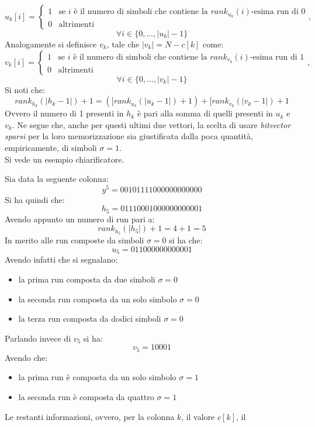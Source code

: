 \[u_k[i]=
  \begin{cases}
    1&\mbox{se }i \mbox{ è il numero di simboli che contiene la
    }rank_{u_k}(i)\mbox{-esima run di 0}\\
    0&\mbox{altrimenti}
  \end{cases},
\]
\vspace{-5mm}
\[\forall i\in\{0,\ldots,|u_k|-1\}\]
Analogamente si definisce $v_k$, tale che $|v_k|=N-c[k]$ come:
\[v_k[i]=
  \begin{cases}
    1&\mbox{se }i \mbox{ è il numero di simboli che contiene la
    }rank_{v_k}(i)\mbox{-esima run di 1}\\
    0&\mbox{altrimenti}
  \end{cases},
\]
\vspace{-5mm}
\[\forall i\in\{0,\ldots,|v_k|-1\}\]
Si noti che:
\[rank_{h_k}(|h_k-1|)+1=([rank_{u_k}(|u_k-1|)+1)+[rank_{v_k}(|v_k-1|)+1\]
Ovvero il numero di 1 presenti in $h_k$ è pari alla somma di quelli presenti in
$u_k$ e $v_k$. Ne segue che, anche per questi ultimi due vettori, la scelta di
usare \textit{bitvector sparsi} per la loro memorizzazione sia giustificata
dalla poca quantità, empiricamente, di simboli $\sigma=1$.\\
Si vede un esempio chiarificatore.
\begin{esempio}
  \label{es:bv1}
  Sia data la seguente colonna:
  \[y^5=00101111000000000000\]
  Si ha quindi che:
  \[h_5=01110001000000000001\]
  Avendo appunto un numero di run pari a:
  \[rank_{h_5}(|h_5|)+1=4+1=5\]
  In merito alle run composte da simboli $\sigma=0$ si ha che:
  \[u_5=011000000000001\]
  Avendo infatti che si segnalano:
  \begin{itemize}
    \item la prima run composta da due simboli $\sigma=0$
    \item la seconda run composta da un solo simbolo $\sigma=0$
    \item la terza run composta da dodici simboli $\sigma=0$
  \end{itemize}
  Parlando invece di $v_5$ si ha:
  \[v_5=10001\]
  Avendo che:
  \begin{itemize}
    \item la prima run è composta da un solo simbolo $\sigma=1$
    \item la seconda run è composta da quattro $\sigma=1$
  \end{itemize}
\end{esempio}
Le restanti informazioni, ovvero, per la colonna $k$, il valore $c[k]$, il
